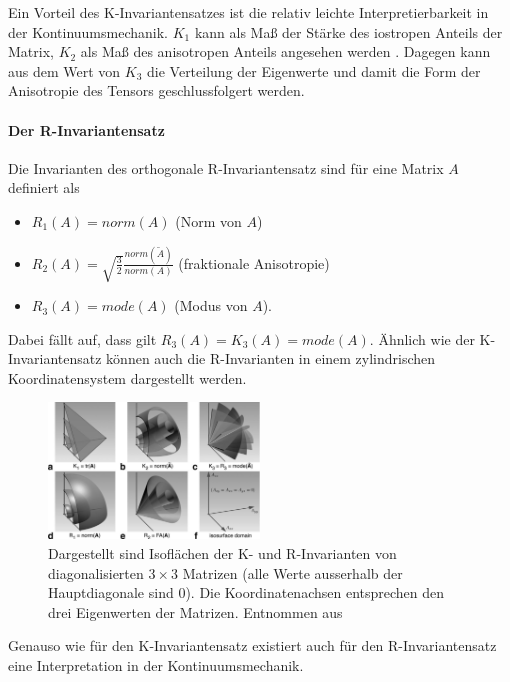\documentclass[a4paper,fontsize=12pt,toc=bib,halfparskip,ngerman]{scrartcl}
\begin{document}
Ein Vorteil des K-Invariantensatzes ist die relativ leichte Interpretierbarkeit in der Kontinuumsmechanik. $K_1$ kann als Ma{\ss} der St\"arke des iostropen Anteils der Matrix, $K_2$ als Ma{\ss} des anisotropen Anteils angesehen werden \cite{kindlmann2007diffusion}. Dagegen kann aus dem Wert von $K_3$ die Verteilung der Eigenwerte und damit die Form der Anisotropie des Tensors geschlussfolgert werden.



\paragraph{Der R-Invariantensatz}
Die Invarianten des orthogonale R-Invariantensatz sind f\"ur eine Matrix $A$ definiert als

\begin{itemize}
	\item $R_1(A)=norm(A)$ (Norm von $A$)
	\item $R_2(A)=\sqrt{\frac{3}{2}} \frac{norm(\tilde{A})}{norm(A)}$ (fraktionale Anisotropie)
	\item $R_3(A)=mode(A)$ (Modus von $A$).
\end{itemize}

Dabei f\"allt auf, dass gilt $R_3(A) = K_3(A) = mode(A)$. \"Ahnlich wie der K-Invariantensatz k\"onnen auch die R-Invarianten in einem zylindrischen Koordinatensystem dargestellt werden.

\begin{figure}
	\centering
	\includegraphics[width=0.5\textwidth]{pictures/000.png}
	\caption{Dargestellt sind Isofl\"achen der K- und R-Invarianten von diagonalisierten $3\times 3$ Matrizen (alle Werte ausserhalb der Hauptdiagonale sind 0). Die Koordinatenachsen entsprechen den drei Eigenwerten der Matrizen. Entnommen aus \cite[S.~139]{ennis2006orthogonal}}
	\label{KRInvariants}
\end{figure}

Genauso wie f\"ur den K-Invariantensatz existiert auch f\"ur den R-Invariantensatz eine Interpretation in der Kontinuumsmechanik. 
\end{document}
